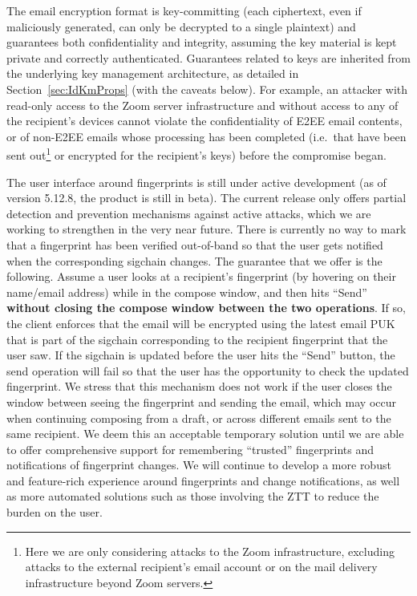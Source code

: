 The email encryption format is key-committing (each ciphertext, even if maliciously generated, can only
be decrypted to a single plaintext) and guarantees both confidentiality and integrity, assuming the
key material is kept private and correctly authenticated. Guarantees related to keys are inherited
from the underlying key management architecture, as detailed in Section~\ref{sec:IdKmProps} (with
the caveats below). For example, an attacker with read-only access to the Zoom server infrastructure
and without access to any of the recipient's devices cannot violate the confidentiality of E2EE
email contents, or of non-E2EE emails whose processing has been completed (i.e.\ that have been sent
out\footnote{Here we are only considering attacks to the Zoom infrastructure, excluding attacks to
the external recipient's email account or on the mail delivery infrastructure beyond Zoom servers.}
or encrypted for the recipient's keys) before the compromise began.

The user interface around fingerprints is still under active development (as of
version 5.12.8, the product is still in beta). The current release only offers partial detection and prevention
mechanisms against active attacks, which we are working to strengthen in the very near future.
There is currently no way to mark that a fingerprint has been verified
out-of-band so that the user gets notified when the corresponding sigchain changes. The guarantee
that we offer is the following. Assume a user looks at a recipient's fingerprint (by hovering on
their name/email address) while in the compose window, and then hits ``Send'' \textbf{without
closing the compose window between the two operations}. If so, the client enforces that the email
will be encrypted using the latest email PUK that is part of the sigchain corresponding to the recipient fingerprint that the user
saw. If the sigchain is updated before the user hits the ``Send'' button, the send operation will
fail so that the user has the opportunity to check the updated fingerprint. We stress that this
mechanism does not work if the user closes the window between seeing the fingerprint and sending the
email, which may occur when continuing composing from a draft, or across different emails sent to
the same recipient. We deem this an acceptable temporary solution until we are able to offer
comprehensive support for remembering ``trusted'' fingerprints and notifications of fingerprint
changes. We will continue to develop a more robust and feature-rich experience around fingerprints
and change notifications, as well as more automated solutions such as those involving the ZTT to
reduce the burden on the user.

